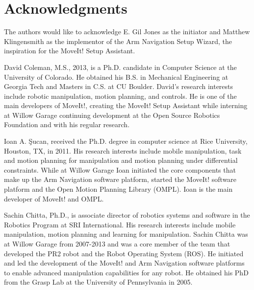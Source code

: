 \documentclass[10pt,journal,compsoc]{joser1}
\begin{document}
{%
\section*{Acknowledgments}
The authors would like to acknowledge E. Gil Jones as the initiator and Matthew Klingensmith as the implementor of the Arm Navigation Setup Wizard, the inspiration for the MoveIt! Setup Assistant.





\begin{IEEEbiography}[{coleman_20131110_f01}]{David Coleman}, M.S., 2013, is a Ph.D. candidate in Computer Science at the University of Colorado. He obtained his B.S. in Mechanical Engineering at Georgia Tech and Masters in C.S. at CU Boulder. David's research interests include robotic manipulation, motion planning, and controls. He is one of the main developers of MoveIt!, creating the MoveIt! Setup Assistant while interning at Willow Garage continuing development at the Open Source Robotics Foundation and with his regular research.
\end{IEEEbiography}

\begin{IEEEbiography}[{coleman_20131110_f02}]{Ioan A. \c{S}ucan}, 
received the Ph.D. degree in computer science at Rice University,
Houston, TX, in 2011. His research interests include mobile
manipulation, task and motion planning for manipulation and motion
planning under differential constraints. While at Willow Garage
Ioan initiated the core components that make up the Arm
Navigation software platform, started the MoveIt! software platform
and the Open Motion Planning Library (OMPL). Ioan is the main
developer of MoveIt! and OMPL.
\end{IEEEbiography}

\begin{IEEEbiography}[{coleman_20131110_f03}]{Sachin Chitta}, Ph.D., is associate director of robotics systems and software in the Robotics Program at SRI International. His research interests include mobile manipulation, motion planning and learning for manipulation. Sachin Chitta was at Willow Garage from 2007-2013 and was a core member of the team that developed the PR2 robot and the Robot Operating System (ROS). He initiated and led the development of the MoveIt! and Arm Navigation software platforms to enable advanced manipulation capabilities for any robot. He obtained his PhD from the Grasp Lab at the University of Pennsylvania in 2005.  
\end{IEEEbiography}

}
\end{document}
